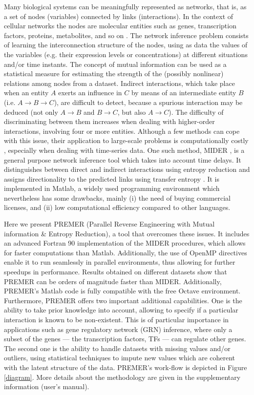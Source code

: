 \documentclass{llncs}
\begin{document}
Many biological systems can be meaningfully represented as networks, that is, as a set of nodes (variables) connected by links (interactions). 
In the context of cellular networks the nodes are molecular entities such as genes, transcription factors, proteins, metabolites, and so on \cite{le2015quantitative}.
The network inference problem consists of learning the interconnection structure of the nodes, using as data the values of the variables (e.g. their expression levels or concentrations) at different situations and/or time instants. 
The concept of mutual information \cite{Shannon1948} can be used as a statistical measure for estimating the strength of the (possibly nonlinear) relations among nodes from a dataset.
Indirect interactions, which take place when an entity $A$ exerts an influence in $C$ by means of an intermediate entity $B$ (i.e. $A\rightarrow B\rightarrow C$), are difficult to detect, because a spurious interaction may be deduced (not only $A\rightarrow B$ and $B \rightarrow C$, but also $A \rightarrow C$). The difficulty of discriminating between them increases when dealing with higher-order interactions, involving four or more entities. Although a few methods can cope with this issue, their application to large-scale problems is computationally costly \cite{jang2013haracne}, especially when dealing with time-series data. One such method, MIDER \cite{villaverde2014mider}, is a general purpose network inference tool which takes into account time delays. It distinguishes between direct and indirect interactions using entropy reduction \cite{Samoilov2001} and assigns directionality to the predicted links using transfer entropy \cite{schreiber2000measuring}. It is implemented in Matlab, a widely used programming environment which nevertheless has some drawbacks, mainly (i) the need of buying commercial licenses, and (ii) low computational efficiency compared to other languages. 

Here we present PREMER (Parallel Reverse Engineering with Mutual information \& Entropy Reduction), a  tool that overcomes these issues. It includes an advanced Fortran 90 implementation of the MIDER procedures, which allows for faster computations than Matlab. Additionally, the use of OpenMP directives enable it to run seamlessly in parallel environments, thus allowing for further speedups in performance. Results obtained on different datasets show that PREMER can be orders of magnitude faster than MIDER. Additionally, PREMER's Matlab code is fully compatible with the free Octave environment. 
Furthermore, PREMER offers two important additional capabilities. One is the ability to take prior knowledge into account, allowing to specify if a particular interaction is known to be non-existent. 
This is of particular importance in applications such as gene regulatory network (GRN) inference, where only a subset of the genes --- the transcription factors, TFs --- can regulate other genes.
The second one is the ability to handle datasets with missing values and/or outliers, using statistical techniques to impute new values which are coherent with the latent structure of the data. PREMER's work-flow is depicted in Figure \ref{diagram}. 
More details about the methodology are given in the supplementary information (user's manual). 
\end{document}
